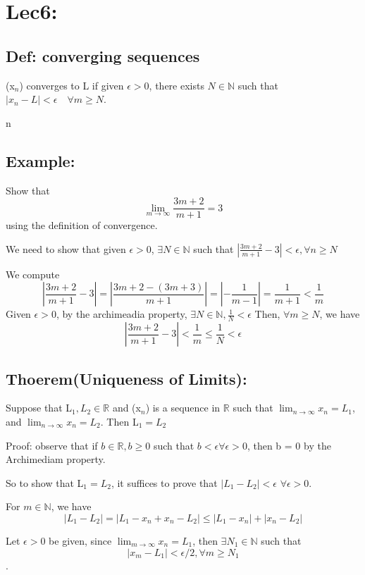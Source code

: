 \documentclass[12pt, a4paper]{ctexart}
\begin{document}
\section{Lec6:}

\subsection{Def: converging sequences}
(x$_{n}$) converges to L if given $\epsilon > 0$, there exists $N \in
\mathbb{N}$ such that $|x_{n} - L| < \epsilon \quad \forall m \ge N$.

n\subsection{Example:}
Show that
\[\lim_{m \rightarrow \infty} \frac{3m+2}{m + 1} = 3 \]
using the definition of convergence.\par

We need to show that given $\epsilon > 0$, $\exists N \in \mathbb{N}$
such that $|\frac{3m + 2}{m + 1} - 3| < \epsilon, \forall n \ge N$

We compute
\[|\frac{3m + 2}{m + 1} - 3| = |\frac{3m + 2 - (3m + 3)}{m + 1}| =
  |-\frac{1}{m - 1}| = \frac{1}{m + 1} < \frac{1}{m}  \]
Given $\epsilon > 0$, by the archimeadia property, $\exists N \in
\mathbb{N}, \frac{1}{N} < \epsilon$ Then, $\forall m \ge N$, we have
\[|\frac{3m + 2}{m + 1} - 3| < \frac{1}{m} \le \frac{1}{N} < \epsilon \]

\subsection{Thoerem(Uniqueness of Limits): }
Suppose that L$_{1}, L_{2} \in \mathbb{R}$ and (x$_{n}$) is a sequence
in $\mathbb{R}$ such that $\lim_{n \rightarrow \infty} x_{n} = L_{1}$,
and  $\lim_{n \rightarrow \infty} x_{n} = L_{2}$. Then L$_{1} = L_{2}$\par

Proof: observe that if $b \in \mathbb{R}, b \ge 0$ such that $b <
\epsilon \forall \epsilon > 0$, then b = 0 by the Archimediam
property. \par
So to show that L$_{1} = L_{2}$, it suffices to prove that $|L_{1} -
L_{2}| < \epsilon$ $\forall \epsilon > 0$.\par

For $m \in \mathbb{N}$, we have
\[|L_{1} - L_{2}| = |L_{1} - x_{n} +
  x_{n} - L_{2}| \le |L_{1} - x_{n}| + |x_{n} - L_{2}| \tag{*}\]

Let $\epsilon > 0$ be given, since $\lim_{m \rightarrow \infty}x_{n} =
L_{1}$, then $\exists N_{1} \in \mathbb{N}$ such that \[|x_{m} - L_{1}|
  < \epsilon/2, \forall m \ge N_{1}\].
\end{document}
